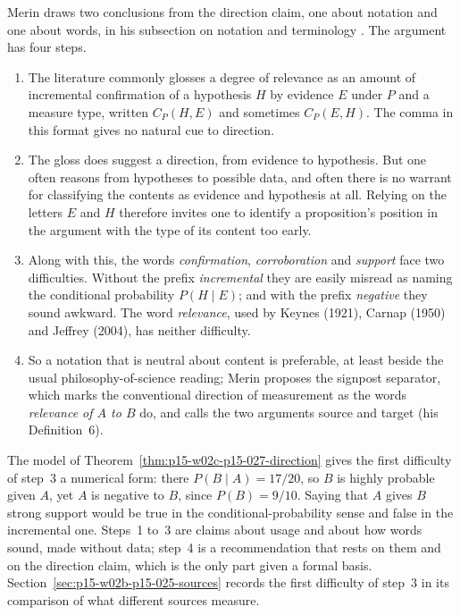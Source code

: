 Merin draws two conclusions from the direction claim, one about notation
and one about words, in his subsection on notation and terminology
\cite[p.~268]{Merin2021Relevance}. The argument has four steps.
\begin{enumerate}
\item The literature commonly glosses a degree of relevance as an amount
  of incremental confirmation of a hypothesis \(H\) by evidence \(E\)
  under \(P\) and a measure type, written \(C_P(H,E)\) and sometimes
  \(C_P(E,H)\). The comma in this format gives no natural cue to
  direction.
\item The gloss does suggest a direction, from evidence to hypothesis.
  But one often reasons from hypotheses to possible data, and often
  there is no warrant for classifying the contents as evidence and
  hypothesis at all. Relying on the letters \(E\) and \(H\) therefore
  invites one to identify a proposition's position in the argument with
  the type of its content too early.
\item Along with this, the words \emph{confirmation},
  \emph{corroboration} and \emph{support} face two difficulties. Without
  the prefix \emph{incremental} they are easily misread as naming the
  conditional probability \(P(H\mid E)\); and with the prefix
  \emph{negative} they sound awkward. The word \emph{relevance}, used by
  Keynes (1921), Carnap (1950) and Jeffrey (2004), has neither
  difficulty.
\item So a notation that is neutral about content is preferable, at least
  beside the usual philosophy-of-science reading; Merin proposes the
  signpost separator, which marks the conventional direction of
  measurement as the words \emph{relevance of \(A\) to \(B\)} do, and
  calls the two arguments source and target (his Definition~6).
\end{enumerate}
The model of Theorem~\ref{thm:p15-w02c-p15-027-direction} gives the first
difficulty of step~3 a numerical form: there
\(P(B\mid A)=17/20\), so \(B\) is highly probable given \(A\), yet \(A\)
is negative to \(B\), since \(P(B)=9/10\). Saying that \(A\) gives \(B\)
strong support would be true in the conditional-probability sense and
false in the incremental one. Steps~1 to~3 are claims about usage and
about how words sound, made without data; step~4 is a recommendation
that rests on them and on the direction claim, which is the only part
given a formal basis. Section~\ref{sec:p15-w02b-p15-025-sources}
records the first difficulty of step~3 in its comparison of what
different sources measure.

